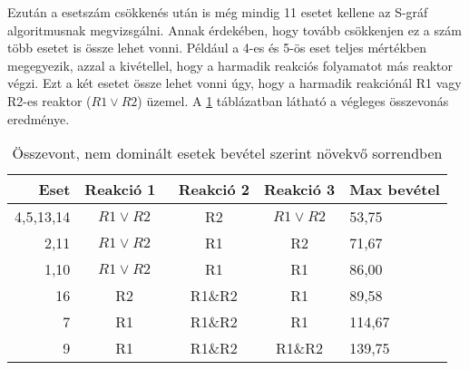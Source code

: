Ezután a esetszám csökkenés után is még mindig 11 esetet kellene az S-gráf algoritmusnak megvizsgálni. Annak érdekében, hogy tovább csökkenjen ez a szám több esetet is össze lehet vonni. Például a 4-es és 5-ös eset teljes mértékben megegyezik, azzal a kivétellel, hogy a harmadik reakciós folyamatot más reaktor végzi. Ezt a két esetet össze lehet vonni úgy, hogy a harmadik reakciónál R1 vagy R2-es reaktor ($R1 \vee R2$) üzemel. A \ref{tabla3} táblázatban látható a végleges összevonás eredménye.

\begin{table}[H]
	\begin{center}
		\caption{Összevont, nem dominált esetek bevétel szerint növekvő sorrendben}
		\captionsetup[table]{skip=10pt}	
		\label{tabla3}	
		\begin{tabular}{r|ccc|l}
		Eset      & Reakció 1~ & Reakció 2 & Reakció 3 & Max bevétel  \\ 
		\hline
		4,5,13,14 & $R1 \vee R2$      & R2 & $R1 \vee R2$     & 53,75        \\
		2,11      & $R1 \vee R2$      & R1        & R2        & 71,67        \\
		1,10      & $R1 \vee R2$      & R1        & R1        & 86,00        \\
		16        & R2         & R1\&R2    & R1        & 89,58        \\
		7         & R1         & R1\&R2    & R1        & 114,67       \\
		9         & R1         & R1\&R2    & R1\&R2    & 139,75      
		\end{tabular}
	\end{center}
\end{table}





